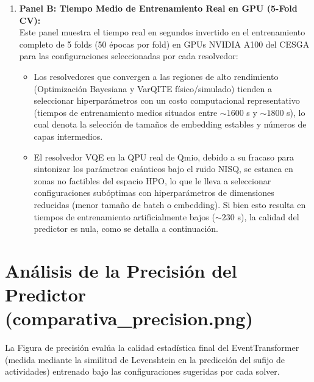 \begin{enumerate}
    \item \textbf{Panel B: Tiempo Medio de Entrenamiento Real en GPU (5-Fold CV):} \\
    Este panel muestra el tiempo real en segundos invertido en el entrenamiento completo de 5 folds (50 épocas por fold) en GPUs NVIDIA A100 del CESGA para las configuraciones seleccionadas por cada resolvedor:
    \begin{itemize}
        \item Los resolvedores que convergen a las regiones de alto rendimiento (Optimización Bayesiana y VarQITE físico/simulado) tienden a seleccionar hiperparámetros con un costo computacional representativo (tiempos de entrenamiento medios situados entre $\sim 1600$ s y $\sim 1800$ s), lo cual denota la selección de tamaños de embedding estables y números de capas intermedios.
        \item El resolvedor VQE en la QPU real de Qmio, debido a su fracaso para sintonizar los parámetros cuánticos bajo el ruido NISQ, se estanca en zonas no factibles del espacio HPO, lo que le lleva a seleccionar configuraciones subóptimas con hiperparámetros de dimensiones reducidas (menor tamaño de batch o embedding). Si bien esto resulta en tiempos de entrenamiento artificialmente bajos ($\sim 230$ s), la calidad del predictor es nula, como se detalla a continuación.
    \end{itemize}
\end{enumerate}

\section{Análisis de la Precisión del Predictor (comparativa\_precision.png)}
\label{sec:analisis_precision}

La Figura de precisión evalúa la calidad estadística final del EventTransformer (medida mediante la similitud de Levenshtein en la predicción del sufijo de actividades) entrenado bajo las configuraciones sugeridas por cada solver.


